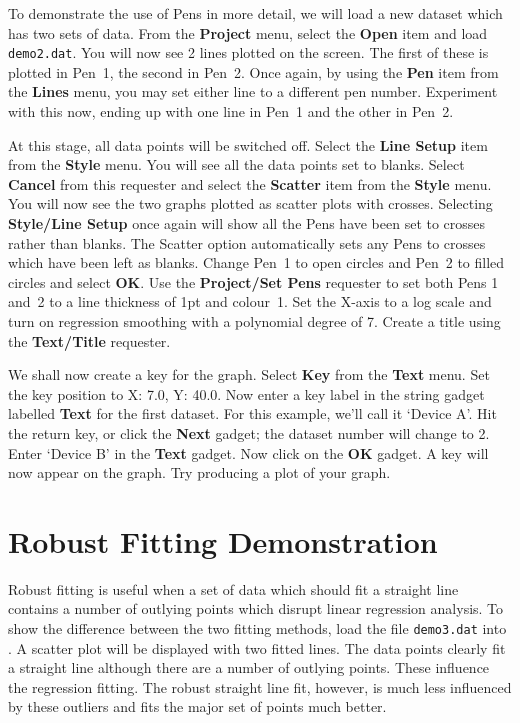 To demonstrate the use of Pens in more detail,
we will load a new dataset which has two sets of data.
From the {\bf Project} menu, select the {\bf Open} item and load {\tt demo2.dat}.
You will now see 2 lines plotted on the screen. The first of these is plotted in 
Pen~1, the second in Pen~2. Once again, by using the {\bf Pen} item from the {\bf 
Lines} menu, you may set either line to a different pen number. Experiment with 
this now, ending up with one line in Pen~1 and the other in Pen~2.

At this stage, all data points will be switched off.
Select the {\bf Line Setup} item from the {\bf Style} menu. You will see all the 
data points set to blanks. 
Select {\bf Cancel} from this requester and select the {\bf Scatter} item from 
the {\bf Style} menu. You will now see the two graphs plotted as scatter plots 
with crosses. Selecting {\bf Style/Line Setup} once again will show all the Pens have 
been set to crosses rather than blanks. The Scatter option automatically sets any
Pens to crosses which have been left as blanks. Change Pen~1 to open circles and 
Pen~2 to filled circles and select {\bf OK}. Use the {\bf Project/Set Pens} 
requester to set both Pens 1 and~2 to a line thickness of 1pt and colour~1.
Set the X-axis to a log scale and turn on regression smoothing with a polynomial 
degree of 7. Create a title using the {\bf Text/Title} requester.

We shall now create a key for the graph. Select {\bf Key} from the {\bf Text} menu.
Set the key position to X: 7.0, Y: 40.0. Now enter a key label in the string gadget 
labelled {\bf Text} for the first dataset. For this example, we'll call it 
`Device A'. Hit the return key, or click the {\bf Next} gadget; the dataset number 
will change to 2. Enter `Device B' in the {\bf Text} gadget. Now click on the {\bf 
OK} gadget. A key will now appear on the graph. Try producing a plot of your graph.








\section{Robust Fitting Demonstration}
\label{sect:rob}
Robust fitting is useful when a set of data
which should fit a straight line 
contains a number of outlying points which disrupt linear regression
 analysis.
To show the difference between the two fitting methods, load the file {\tt demo3.dat}
into \amplot. A scatter plot will be displayed with two fitted lines. The 
data points clearly fit a straight line although there are a number of outlying 
points. These influence the regression fitting. The robust straight line fit, 
however, is much less influenced by these outliers and fits the major set of 
points much better.








